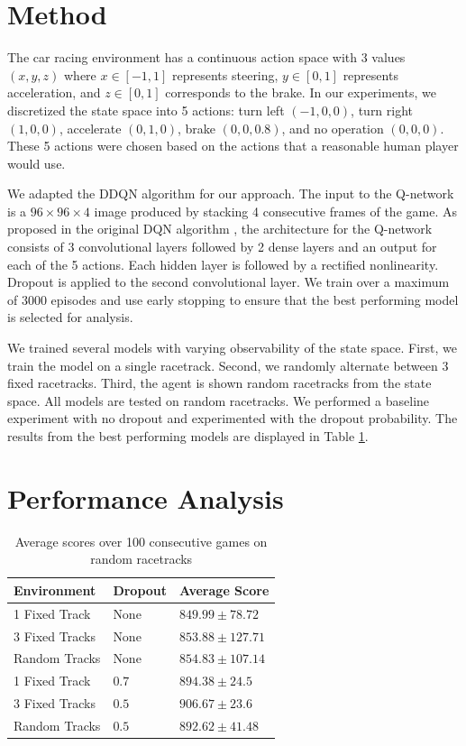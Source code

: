 \documentclass{article}
\begin{document}
\section{Method}
The car racing environment has a continuous action space with 3 values $(x, y, z)$ where $x \in [-1, 1]$ represents steering, $y \in [0, 1]$ represents acceleration, and $z \in [0, 1]$ corresponds to the brake. In our experiments, we discretized the state space into 5 actions: turn left $(-1, 0, 0)$, turn right $(1, 0, 0)$, accelerate $(0, 1, 0)$, brake $(0, 0, 0.8)$, and no operation $(0, 0, 0)$. These 5 actions were chosen based on the actions that a reasonable human player would use.

We adapted the DDQN algorithm \cite{DDQN} for our approach. The input to the Q-network is a $96\times96\times4$ image produced by stacking 4 consecutive frames of the game. As proposed in the original DQN algorithm \cite{DQN}, the architecture for the Q-network consists of 3 convolutional layers followed by 2 dense layers and an output for each of the 5 actions. Each hidden layer is followed by a rectified nonlinearity. Dropout is applied to the second convolutional layer. We train over a maximum of 3000 episodes and use early stopping to ensure that the best performing model is selected for analysis.

We trained several models with varying observability of the state space. First, we train the model on a single racetrack. Second, we randomly alternate between 3 fixed racetracks. Third, the agent is shown random racetracks from the state space. All models are tested on random racetracks. We performed a baseline experiment with no dropout and experimented with the dropout probability. The results from the best performing models are displayed in Table \ref{tab:scores}.

\section{Performance Analysis}
\begin{table}[h!]
  \begin{center}
    \begin{tabular}{l|l|l}
      \textbf{Environment} & \textbf{Dropout} & \textbf{Average Score}\\
      \hline
      1 Fixed Track & None & $849.99\pm78.72$ \\
      3 Fixed Tracks & None & $853.88\pm127.71$ \\
      Random Tracks & None & $854.83\pm107.14$ \\
      1 Fixed Track & $0.7$ & $894.38\pm24.5$ \\
      3 Fixed Tracks & $0.5$ & $906.67\pm23.6$ \\
      Random Tracks & $0.5$ & $892.62\pm41.48$ \\
    \end{tabular}
    \vspace{0.1cm}
    \caption{Average scores over 100 consecutive games on random racetracks}
    \label{tab:scores}
  \end{center}
\end{table}
\end{document}

